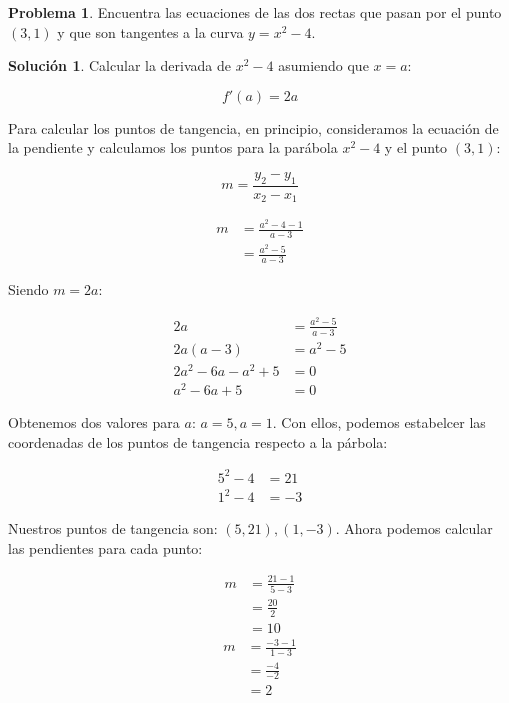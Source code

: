 \documentclass{article}
\theoremstyle{definition}
\newtheorem{problem}{Problema}
\newtheorem*{solution}{Solución}
\begin{document}
\bigskip

\begin{problem}
Encuentra las ecuaciones de las dos rectas que pasan por el punto \((3,1)\) y que son tangentes a la curva \( y = x^2 - 4 \).
\end{problem}

\begin{solution}
Calcular la derivada de \( x^2 - 4 \) asumiendo que \( x= a \):

\[
    f'(a) = 2a
\]
    
Para calcular los puntos de tangencia, en principio, consideramos la ecuación de la pendiente y calculamos los puntos para la parábola \( x^2 - 4 \) y el punto \( (3, 1) \): 

\[
    m = \frac{y_2-y_1}{x_2-x_1}
\]

\begin{align*}
    m &= \frac{a^2-4-1}{a-3} \\
    &= \frac{a^2-5}{a-3}
\end{align*}

Siendo \( m = 2a \):

\begin{align*}
    2a &= \frac{a^2-5}{a-3} \\
    2a(a-3) &= a^2 - 5 \\
    2a^2-6a-a^2+5 &= 0 \\
    a^2-6a+5 &= 0 
\end{align*}

Obtenemos dos valores para \( a \): \( a=5, a=1\). Con ellos, podemos estabelcer las coordenadas de los puntos de tangencia respecto a la párbola:

\begin{align*}
    5^2 - 4 &= 21 \\
    1^2 - 4 &= - 3
\end{align*}

Nuestros puntos de tangencia son: \( (5, 21), (1, -3)\). Ahora podemos calcular las pendientes para cada punto:

\begin{align*}
    m &= \frac{21-1}{5-3} \\
    &= \frac{20}{2} \\
    &= 10
\end{align*}
\begin{align*}
    m &= \frac{-3-1}{1-3} \\
    &= \frac{-4}{-2} \\
    &= 2
\end{align*}


\end{solution}
\end{document}

